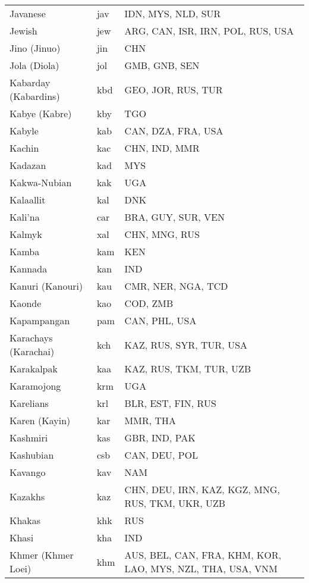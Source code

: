 \documentclass[12pt]{article}
\begin{document}
\begin{center}
\begin{longtable}{|p{7cm}|p{1cm}|p{7cm}|}
Javanese	&	jav 	&	IDN, MYS, NLD, SUR	\\	\cline{1-3}
Jewish	&	jew	&	ARG, CAN, ISR, IRN, POL, RUS, USA	\\	\cline{1-3}
Jino (Jinuo)	&	jin	&	CHN	\\	\cline{1-3}
Jola (Diola)	&	jol	&	GMB, GNB, SEN	\\	\cline{1-3}
Kabarday (Kabardins)	&	kbd 	&	GEO, JOR, RUS, TUR	\\	\cline{1-3}
Kabye (Kabre)	&	kby	&	TGO	\\	\cline{1-3}
Kabyle	&	kab 	&	CAN, DZA, FRA, USA	\\	\cline{1-3}
Kachin	&	kac 	&	CHN, IND, MMR	\\	\cline{1-3}
Kadazan	&	kad	&	MYS	\\	\cline{1-3}
Kakwa-Nubian	&	kak	&	UGA	\\	\cline{1-3}
Kalaallit	&	kal 	&	DNK	\\	\cline{1-3}
Kali'na	&	car 	&	BRA, GUY, SUR, VEN	\\	\cline{1-3}
Kalmyk	&	xal 	&	CHN, MNG, RUS	\\	\cline{1-3}
Kamba	&	kam 	&	KEN	\\	\cline{1-3}
Kannada	&	kan 	&	IND	\\	\cline{1-3}
Kanuri (Kanouri)	&	kau 	&	CMR, NER, NGA, TCD	\\	\cline{1-3}
Kaonde	&	kao	&	COD, ZMB	\\	\cline{1-3}
Kapampangan	&	pam 	&	CAN, PHL, USA	\\	\cline{1-3}
Karachays (Karachai)	&	kch	&	KAZ, RUS, SYR, TUR, USA	\\	\cline{1-3}
Karakalpak	&	kaa 	&	KAZ, RUS, TKM, TUR, UZB	\\	\cline{1-3}
Karamojong	&	krm	&	UGA	\\	\cline{1-3}
Karelians	&	krl 	&	BLR, EST, FIN, RUS	\\	\cline{1-3}
Karen (Kayin)	&	kar 	&	MMR, THA	\\	\cline{1-3}
Kashmiri	&	kas 	&	GBR, IND, PAK	\\	\cline{1-3}
Kashubian	&	csb 	&	CAN, DEU, POL	\\	\cline{1-3}
Kavango	&	kav	&	NAM	\\	\cline{1-3}
Kazakhs	&	kaz 	&	CHN, DEU, IRN, KAZ, KGZ, MNG, RUS, TKM, UKR, UZB	\\	\cline{1-3}
Khakas	&	khk	&	RUS	\\	\cline{1-3}
Khasi	&	kha 	&	IND	\\	\cline{1-3}
Khmer (Khmer Loei)	&	khm 	&	AUS, BEL, CAN, FRA, KHM, KOR, LAO, MYS, NZL, THA, USA, VNM	\\	\cline{1-3}

\end{longtable}
\end{center}
\end{document}
